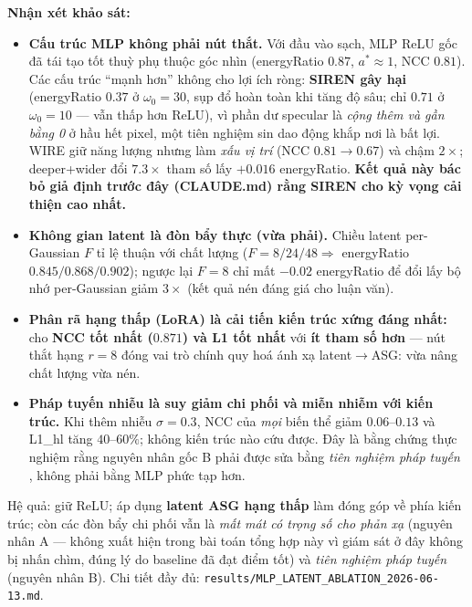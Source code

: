     \textbf{Nhận xét khảo sát:}
    \begin{itemize}
        \item \textbf{Cấu trúc MLP không phải nút thắt.} Với đầu vào sạch, MLP ReLU
        gốc đã tái tạo tốt thuỳ phụ thuộc góc nhìn (energyRatio $0.87$, $a^*\approx 1$,
        NCC $0.81$). Các cấu trúc ``mạnh hơn'' không cho lợi ích ròng: \textbf{SIREN
        gây hại} (energyRatio $0.37$ ở $\omega_0=30$, sụp đổ hoàn toàn khi tăng độ sâu;
        chỉ $0.71$ ở $\omega_0=10$ --- vẫn thấp hơn ReLU), vì phần dư specular là
        \textit{cộng thêm và gần bằng 0} ở hầu hết pixel, một tiên nghiệm sin dao động
        khắp nơi là bất lợi. WIRE giữ năng lượng nhưng làm \textit{xấu vị trí} (NCC
        $0.81\!\to\!0.67$) và chậm $2\times$; deeper+wider đổi $7.3\times$ tham số lấy
        $+0.016$ energyRatio. \textbf{Kết quả này bác bỏ giả định trước đây (CLAUDE.md)
        rằng SIREN cho kỳ vọng cải thiện cao nhất.}
        \item \textbf{Không gian latent là đòn bẩy thực (vừa phải).} Chiều latent
        per-Gaussian $F$ tỉ lệ thuận với chất lượng ($F=8/24/48 \Rightarrow$ energyRatio
        $0.845/0.868/0.902$); ngược lại $F=8$ chỉ mất $-0.02$ energyRatio để đổi lấy
        bộ nhớ per-Gaussian giảm $3\times$ (kết quả nén đáng giá cho luận văn).
        \item \textbf{Phân rã hạng thấp (LoRA) là cải tiến kiến trúc xứng đáng nhất:}
        cho \textbf{NCC tốt nhất ($0.871$) và L1 tốt nhất} với \textbf{ít tham số hơn}
        --- nút thắt hạng $r=8$ đóng vai trò chính quy hoá ánh xạ latent$\to$ASG: vừa
        nâng chất lượng vừa nén.
        \item \textbf{Pháp tuyến nhiễu là suy giảm chi phối và miễn nhiễm với kiến
        trúc.} Khi thêm nhiễu $\sigma=0.3$, NCC của \textit{mọi} biến thể giảm
        $0.06$--$0.13$ và L1\_hl tăng $40$--$60\%$; không kiến trúc nào cứu được. Đây
        là bằng chứng thực nghiệm rằng nguyên nhân gốc B phải được sửa bằng
        \textit{tiên nghiệm pháp tuyến} \cite{dnsplatter}, không phải bằng MLP phức tạp
        hơn.
    \end{itemize}
    Hệ quả: giữ ReLU; áp dụng \textbf{latent ASG hạng thấp} làm đóng góp về phía kiến
    trúc; còn các đòn bẩy chi phối vẫn là \textit{mất mát có trọng số cho phản xạ}
    (nguyên nhân A --- không xuất hiện trong bài toán tổng hợp này vì giám sát ở đây
    không bị nhấn chìm, đúng lý do baseline đã đạt điểm tốt) và \textit{tiên nghiệm
    pháp tuyến} (nguyên nhân B). Chi tiết đầy đủ:
    \texttt{results/MLP\_LATENT\_ABLATION\_2026-06-13.md}.

